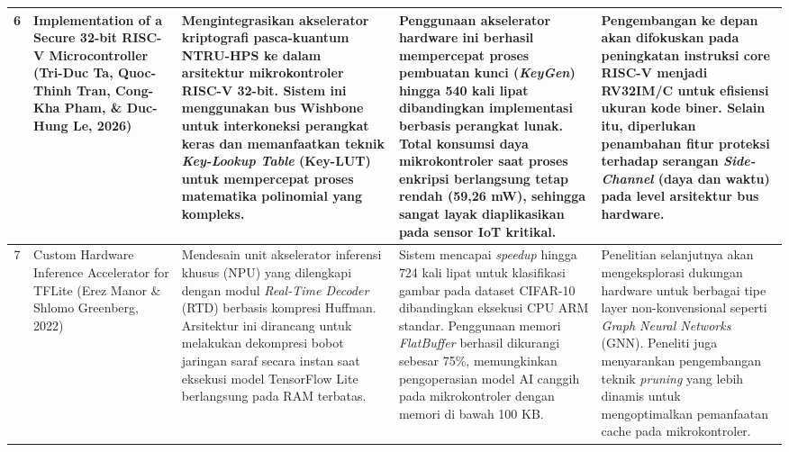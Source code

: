 \documentclass[12pt,a4paper]{article}
\begin{document}
\begin{small}
\begin{longtable}{|c|>{\raggedright\arraybackslash}p{3cm}|>{\raggedright\arraybackslash}p{4cm}|>{\raggedright\arraybackslash}p{4cm}|>{\raggedright\arraybackslash}p{4cm}|}
6 & Implementation of a Secure 32-bit RISC-V Microcontroller (Tri-Duc Ta, Quoc-Thinh Tran, Cong-Kha Pham, \& Duc-Hung Le, 2026) & Mengintegrasikan akselerator kriptografi pasca-kuantum NTRU-HPS ke dalam arsitektur mikrokontroler RISC-V 32-bit. Sistem ini menggunakan bus Wishbone untuk interkoneksi perangkat keras dan memanfaatkan teknik \textit{Key-Lookup Table} (Key-LUT) untuk mempercepat proses matematika polinomial yang kompleks. & Penggunaan akselerator hardware ini berhasil mempercepat proses pembuatan kunci (\textit{KeyGen}) hingga 540 kali lipat dibandingkan implementasi berbasis perangkat lunak. Total konsumsi daya mikrokontroler saat proses enkripsi berlangsung tetap rendah (59,26 mW), sehingga sangat layak diaplikasikan pada sensor IoT kritikal. & Pengembangan ke depan akan difokuskan pada peningkatan instruksi core RISC-V menjadi RV32IM/C untuk efisiensi ukuran kode biner. Selain itu, diperlukan penambahan fitur proteksi terhadap serangan \textit{Side-Channel} (daya dan waktu) pada level arsitektur bus hardware. \\ \hline

7 & Custom Hardware Inference Accelerator for TFLite (Erez Manor \& Shlomo Greenberg, 2022) & Mendesain unit akselerator inferensi khusus (NPU) yang dilengkapi dengan modul \textit{Real-Time Decoder} (RTD) berbasis kompresi Huffman. Arsitektur ini dirancang untuk melakukan dekompresi bobot jaringan saraf secara instan saat eksekusi model TensorFlow Lite berlangsung pada RAM terbatas. & Sistem mencapai \textit{speedup} hingga 724 kali lipat untuk klasifikasi gambar pada dataset CIFAR-10 dibandingkan eksekusi CPU ARM standar. Penggunaan memori \textit{FlatBuffer} berhasil dikurangi sebesar 75\%, memungkinkan pengoperasian model AI canggih pada mikrokontroler dengan memori di bawah 100 KB. & Penelitian selanjutnya akan mengeksplorasi dukungan hardware untuk berbagai tipe layer non-konvensional seperti \textit{Graph Neural Networks} (GNN). Peneliti juga menyarankan pengembangan teknik \textit{pruning} yang lebih dinamis untuk mengoptimalkan pemanfaatan cache pada mikrokontroler. \\ \hline


\end{longtable}
\end{small}
\end{document}
